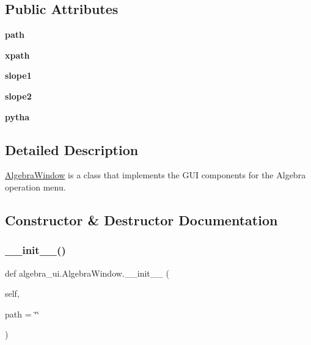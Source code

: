 \subsection*{Public Attributes}
\begin{DoxyCompactItemize}
\item 
\mbox{\label{classalgebra__ui_1_1_algebra_window_ae16b0dcdab0a23dcd7e70c9393a237f8}} 
{\bfseries path}
\item 
\mbox{\label{classalgebra__ui_1_1_algebra_window_ab1e51746684b78e3f212c021727e2eeb}} 
{\bfseries xpath}
\item 
\mbox{\label{classalgebra__ui_1_1_algebra_window_ada16e7befcac57d298e6ff6ea809c04f}} 
{\bfseries slope1}
\item 
\mbox{\label{classalgebra__ui_1_1_algebra_window_acdb30e012617d014d4b7c58c157d1472}} 
{\bfseries slope2}
\item 
\mbox{\label{classalgebra__ui_1_1_algebra_window_af928f66e8c1f01f3a3131db1f371608b}} 
{\bfseries pytha}
\end{DoxyCompactItemize}


\subsection{Detailed Description}
\hyperlink{classalgebra__ui_1_1_algebra_window}{Algebra\+Window} is a class that implements the G\+UI components for the Algebra operation menu. 

\subsection{Constructor \& Destructor Documentation}
\mbox{\label{classalgebra__ui_1_1_algebra_window_a8a5c82431399cd2792b44fdcff991873}} 
\subsubsection{\texorpdfstring{\+\_\+\+\_\+init\+\_\+\+\_\+()}{\_\_init\_\_()}}
{\footnotesize\ttfamily def algebra\+\_\+ui.\+Algebra\+Window.\+\_\+\+\_\+init\+\_\+\+\_\+ (\begin{DoxyParamCaption}\item[{}]{self,  }\item[{}]{path = {\ttfamily \char`\"{}\char`\"{}} }\end{DoxyParamCaption})}



